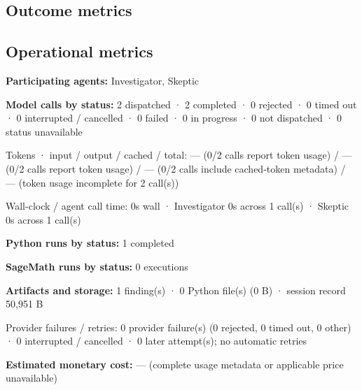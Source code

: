 \documentclass[11pt]{article}
\begin{document}
\subsection{Outcome metrics}
\subsection{Operational metrics}
\textbf{Participating agents:} Investigator, Skeptic\par
\textbf{Model calls by status:} 2 dispatched · 2 completed · 0 rejected · 0 timed out · 0 interrupted / cancelled · 0 failed · 0 in progress · 0 not dispatched · 0 status unavailable\par
Tokens · input / output / cached / total: — (0/2 calls report token usage) / — (0/2 calls report token usage) / — (0/2 calls include cached-token metadata) / — (token usage incomplete for 2 call(s))\par
Wall-clock / agent call time: 0s wall · Investigator 0s across 1 call(s) · Skeptic 0s across 1 call(s)\par
\textbf{Python runs by status:} 1 completed\par
\textbf{SageMath runs by status:} 0 executions\par
\textbf{Artifacts and storage:} 1 finding(s) · 0 Python file(s) (0 B) · session record 50,951 B\par
Provider failures / retries: 0 provider failure(s) (0 rejected, 0 timed out, 0 other) · 0 interrupted / cancelled · 0 later attempt(s); no automatic retries\par
\textbf{Estimated monetary cost:} — (complete usage metadata or applicable price unavailable)\par
\end{document}
